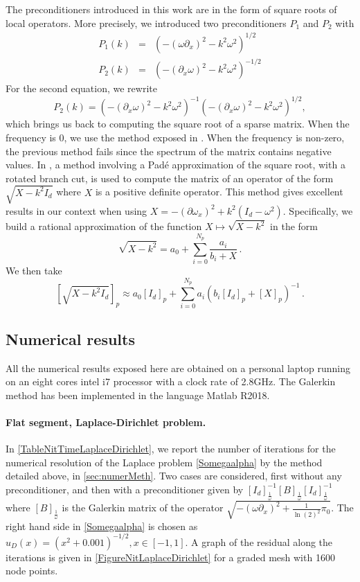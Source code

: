 \documentclass[a4paper]{subfiles}
\begin{document}
The preconditioners introduced in this work are in the form of square roots of local operators. More precisely, we introduced two preconditioners $P_1$ and $P_2$ with 
\begin{eqnarray*}
	P_1(k) &=& \left(-(\omega \partial_x)^2 - k^2 \omega^2\right)^{1/2}\\
	P_2(k) &=& \left(-(\partial_x \omega)^2 - k^2 \omega^2 \right)^{-1/2}
\end{eqnarray*}
For the second equation, we rewrite 
\[P_2(k) = \left(-(\partial_x \omega)^2 - k^2 \omega^2 \right)^{-1} \left(-(\partial_x \omega)^2 - k^2 \omega^2 \right)^{1/2},\]
which brings us back to computing the square root of a sparse matrix. When the frequency is $0$, we use the method exposed in \cite{hale2008computing}. 
When the frequency is non-zero, the previous method fails since the spectrum of the matrix contains negative values. In \cite{antoine2007generalized}, a 
method involving a Pad\'e approximation of the square root, with a rotated branch cut, is used to compute the matrix of an operator of the form 
$\sqrt{X - k^2 I_d}$ where $X$ is a positive definite operator. This method gives excellent results in our context when using 
$X = -(\partial \omega_x)^2 + k^2 \left(I_d - \omega^2\right)$. Specifically, we build a rational approximation of the function $X \mapsto \sqrt{X - k^2}$ in the form
\[\sqrt{X - k^2} = a_0 + \sum_{i = 0}^{N_p} \frac{a_i}{b_i + X}\,.\]
We then take
\[\left[\sqrt{X - k^2 I_d}\right]_p \approx a_0[I_d]_p + \sum_{i = 0}^{N_p} a_i\left(b_i[I_d]_p + [X]_p\right)^{-1}\,.\]

\subsection{Numerical results}
\label{sec:NumericalResutls}

All the numerical results exposed here are obtained on a personal laptop running on an eight cores intel i7 processor with a clock rate of 2.8GHz. 
The Galerkin method has been implemented in the language Matlab R2018. 


\paragraph{Flat segment, Laplace-Dirichlet problem.} 
In \autoref{TableNitTimeLaplaceDirichlet}, we report the number of iterations for the numerical resolution of the Laplace problem \eqref{Somegaalpha} 
by the method detailed above, in \autoref{sec:numerMeth}. Two cases are considered, first without any preconditioner, and then with a preconditioner given 
by $[I_d]_\frac{1}{\omega}^{-1} \left[B \right]_\frac{1}{\omega} [I_d]_\frac{1}{\omega}^{-1}$ where
$[B]_\frac{1}{\omega}$ is the Galerkin matrix of the operator $\sqrt{ -(\omega \partial_x)^2 + \frac{1}{\ln(2)^2} \pi_0}$. The right hand 
side in \eqref{Somegaalpha} is chosen as $u_D(x) = (x^2 + 0.001)^{-1/2}, x \in [-1,1]$. A graph of the residual along the iterations is given in \autoref{FigureNitLaplaceDirichlet} for a graded mesh with 1600 node points. 
\end{document}
